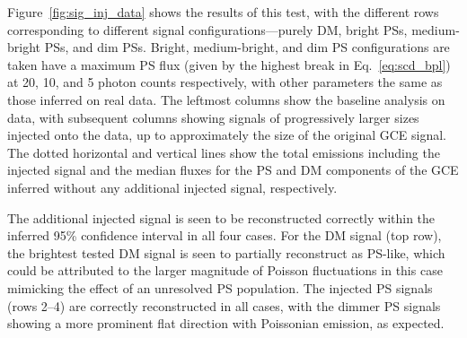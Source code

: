 \documentclass[prd,aps,10pt,nofootinbib,twocolumn,superscriptaddress,preprintnumbers,balancelastpage,longbibliography]{revtex4-1}
\begin{document}
Figure~\ref{fig:sig_inj_data} shows the results of this test, with the different rows corresponding to different signal configurations---purely DM, bright PSs, medium-bright PSs, and dim PSs. Bright, medium-bright, and dim PS configurations are taken have a maximum PS flux (given by the highest break in Eq.~\eqref{eq:scd_bpl}) at 20, 10, and 5 photon counts respectively, with other parameters the same as those inferred on real \Fermi data. The leftmost columns show the baseline analysis on \Fermi data, with subsequent columns showing signals of progressively larger sizes injected onto the data, up to approximately the size of the original GCE signal. The dotted horizontal and vertical lines show the total emissions including the injected signal and the median fluxes for the PS and DM components of the GCE inferred without any additional injected signal, respectively. 

The additional injected signal is seen to be reconstructed correctly within the inferred 95\% confidence interval in all four cases. For the DM signal (top row), the brightest tested DM signal is seen to partially reconstruct as PS-like, which could be attributed to the larger magnitude of Poisson fluctuations in this case mimicking the effect of an unresolved PS population. The injected PS signals (rows 2--4) are correctly reconstructed in all cases, with the dimmer PS signals showing a more prominent flat direction with Poissonian emission, as expected.
\end{document}
